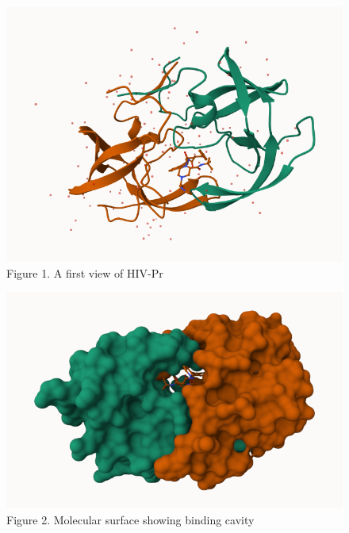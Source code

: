 \documentclass[
  letterpaper,
  DIV=11,
  numbers=noendperiod]{scrartcl}
\begin{document}
\begin{figure}[H]

{\centering \includegraphics{1HSG.png}

}

\caption{Figure 1. A first view of HIV-Pr}

\end{figure}%
\begin{figure}[H]

{\centering \includegraphics{1HSG1.png}

}

\caption{Figure 2. Molecular surface showing binding cavity}

\end{figure}%
\end{document}
